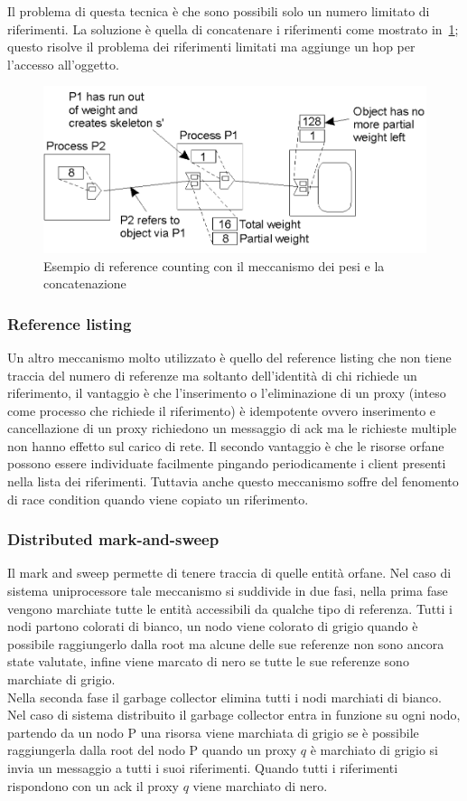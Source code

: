 Il problema di questa tecnica è che sono possibili solo un numero limitato di riferimenti. La soluzione è quella di concatenare i riferimenti come mostrato in \figurename\,\ref{fig:weightconcat}; questo risolve il problema dei riferimenti limitati ma aggiunge un hop per l'accesso all'oggetto.
\begin{figure}[htb]
\centering
\includegraphics[scale=0.4]{img/weightconcat.png}
\caption{Esempio di reference counting con il meccanismo dei pesi e la concatenazione}\label{fig:weightconcat}
\end{figure}
\subsubsection{Reference listing}
Un altro meccanismo molto utilizzato è quello del reference listing che non tiene traccia del numero di referenze ma soltanto dell'identità di chi richiede un riferimento, il vantaggio è che l'inserimento o l'eliminazione di un proxy (inteso come processo che richiede il riferimento) è idempotente ovvero inserimento e cancellazione di un proxy richiedono un messaggio di ack ma le richieste multiple non hanno effetto sul carico di rete. Il secondo vantaggio è che le risorse orfane possono essere individuate facilmente pingando periodicamente i client presenti nella lista dei riferimenti. Tuttavia anche questo meccanismo soffre del fenomento di race condition quando viene copiato un riferimento.
\subsubsection{Distributed mark-and-sweep}
Il mark and sweep permette di tenere traccia di quelle entità orfane. Nel caso di sistema uniprocessore tale meccanismo si suddivide in due fasi, nella prima fase vengono marchiate tutte le entità accessibili da qualche tipo di referenza. Tutti i nodi partono colorati di bianco, un nodo viene colorato di grigio quando è possibile raggiungerlo dalla root ma alcune delle sue referenze non sono ancora state valutate, infine viene marcato di nero se tutte le sue referenze sono marchiate di grigio.\\
Nella seconda fase il garbage collector elimina tutti i nodi marchiati di bianco.\\
Nel caso di sistema distribuito il garbage collector entra in funzione su ogni nodo, partendo da un nodo P una risorsa viene marchiata di grigio se è possibile raggiungerla dalla root del nodo P quando un proxy $q$ è marchiato di grigio si invia un messaggio a tutti i suoi riferimenti. Quando tutti i riferimenti rispondono con un ack il proxy $q$ viene marchiato di nero.